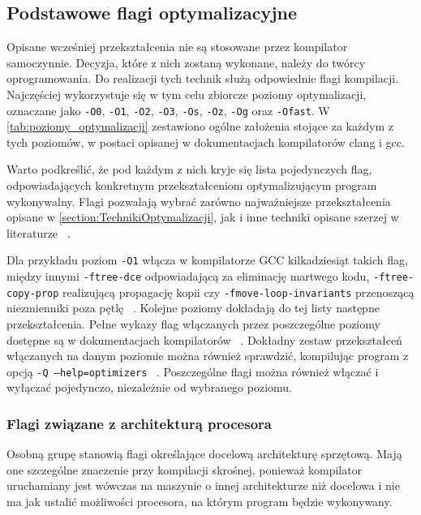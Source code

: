 \subsection{Podstawowe flagi optymalizacyjne}

Opisane wcześniej przekształcenia nie są stosowane przez kompilator samoczynnie. Decyzja, które z nich zostaną wykonane, należy do twórcy oprogramowania. Do realizacji tych technik służą odpowiednie flagi kompilacji. Najczęściej wykorzystuje się w tym celu zbiorcze poziomy optymalizacji, oznaczane jako \texttt{-O0}, \texttt{-O1}, \texttt{-O2}, \texttt{-O3}, \texttt{-Os}, \texttt{-Oz}, \texttt{-Og} oraz \texttt{-Ofast}. W \cref{tab:poziomy_optymalizacji} zestawiono ogólne założenia stojące za każdym z tych poziomów, w postaci opisanej w dokumentacjach kompilatorów clang i gcc.

Warto podkreślić, że pod każdym z nich kryje się lista pojedynczych flag, odpowiadających konkretnym przekształceniom optymalizującym program wykonywalny. Flagi pozwalają wybrać zarówno najważniejsze przekształcenia opisane w \cref{section:TechnikiOptymalizacji}, jak i inne techniki opisane szerzej w literaturze ~\cite{Kompilatory_Aho}.

Dla przykładu poziom \texttt{-O1} włącza w kompilatorze GCC kilkadziesiąt takich flag, między innymi \texttt{-ftree-dce} odpowiadającą za eliminację martwego kodu, \texttt{-ftree-copy-prop} realizującą propagację kopii czy \texttt{-fmove-loop-invariants} przenoszącą niezmienniki poza pętlę ~\cite{gcc_optlevels}. Kolejne poziomy dokładają do tej listy następne przekształcenia. Pełne wykazy flag włączanych przez poszczególne poziomy dostępne są w dokumentacjach kompilatorów ~\cite{gcc_optlevels, clang_cmdguide}. Dokładny zestaw przekształceń włączanych na danym poziomie można również sprawdzić, kompilując program z opcją \texttt{-Q --help=optimizers} ~\cite{gcc_optlevels}.
Poszczególne flagi można również włączać i wyłączać pojedynczo, niezależnie od wybranego poziomu.

\subsubsection{Flagi związane z architekturą procesora}

Osobną grupę stanowią flagi określające docelową architekturę sprzętową. Mają one szczególne znaczenie przy kompilacji skrośnej, ponieważ kompilator uruchamiany jest wówczas na maszynie o innej architekturze niż docelowa i nie ma jak ustalić możliwości procesora, na którym program będzie wykonywany.

